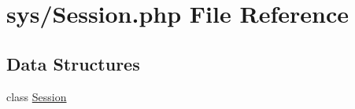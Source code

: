 \hypertarget{_session_8php}{}\section{sys/\+Session.php File Reference}
\label{_session_8php}
\subsection*{Data Structures}
\begin{DoxyCompactItemize}
\item 
class \hyperlink{class_session}{Session}
\end{DoxyCompactItemize}
